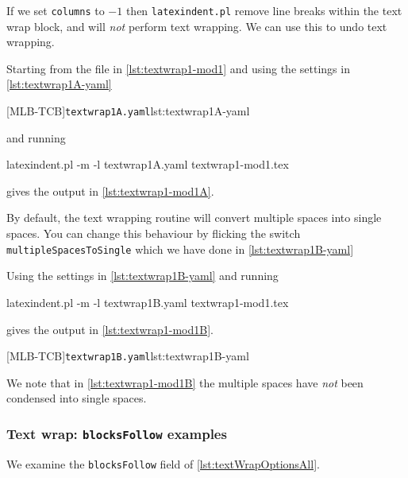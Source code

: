  \begin{example}
 If we set \texttt{columns} to $-1$ then \texttt{latexindent.pl} remove line breaks
 within the text wrap block, and will \emph{not} perform text wrapping. We can use this
 to undo text wrapping. 

 Starting from the file in \cref{lst:textwrap1-mod1} and using the settings in
 \cref{lst:textwrap1A-yaml}

 [MLB-TCB]{\texttt{textwrap1A.yaml}}{lst:textwrap1A-yaml}

 and running

 \begin{commandshell}
latexindent.pl -m -l textwrap1A.yaml textwrap1-mod1.tex
\end{commandshell}

 gives the output in \cref{lst:textwrap1-mod1A}.

 \end{example}

 \begin{example}
 By default, the text wrapping routine will convert multiple spaces into single spaces.
 You can change this behaviour by flicking the switch \texttt{multipleSpacesToSingle}
 which we have done in \cref{lst:textwrap1B-yaml}

 Using the settings in \cref{lst:textwrap1B-yaml} and running

 \begin{commandshell}
latexindent.pl -m -l textwrap1B.yaml textwrap1-mod1.tex
\end{commandshell}

 gives the output in \cref{lst:textwrap1-mod1B}.
 \begin{cmhtcbraster}[raster column skip=.1\linewidth]
  [MLB-TCB]{\texttt{textwrap1B.yaml}}{lst:textwrap1B-yaml}
 \end{cmhtcbraster}
 We note that in \cref{lst:textwrap1-mod1B} the multiple spaces have \emph{not} been
 condensed into single spaces.
 \end{example}

\subsubsection{Text wrap: \texttt{blocksFollow} examples}
 We examine the \texttt{blocksFollow} field of \cref{lst:textWrapOptionsAll}. 

